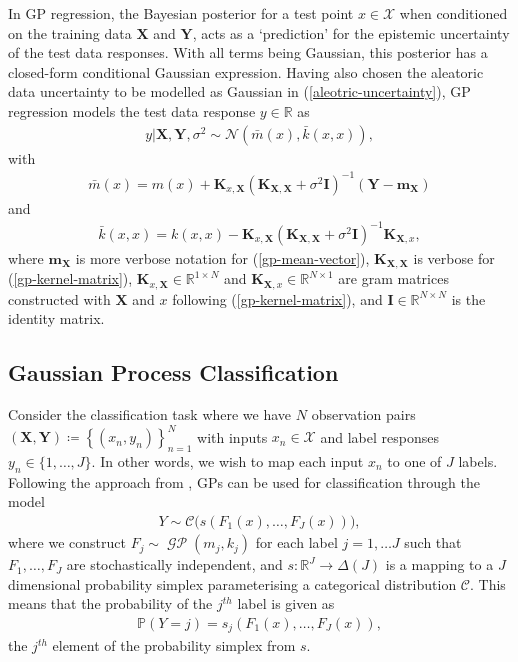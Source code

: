 \documentclass{article}
\newcommand{\GP}{\operatorname{\mathcal{GP}}}
\numberwithin{equation}{section}
\begin{document}
In GP regression, the Bayesian posterior for a test point $x \in \mathcal{X}$ when conditioned on the training data $\mathbf{X}$ and $\mathbf{Y}$, acts as a `prediction' for the epistemic uncertainty of the test data responses. 
With all terms being Gaussian, this posterior has a closed-form conditional Gaussian expression.
Having also chosen the aleatoric data uncertainty to be modelled as Gaussian in (\ref{aleotric-uncertainty}), GP regression models the test data response $y \in \mathbb{R}$ as
\begin{align}
    y \vert \mathbf{X}, \mathbf{Y}, \sigma^2
    \sim \mathcal{N}\left(\bar{m}(x), \bar{k}(x, x)\right),
    \label{gp-posterior-normal}
\end{align}
with
\begin{align}
    \label{gp-posterior-mean}
    \bar{m}(x) = m(x) + \mathbf{K}_{x, \mathbf{X}} \left(\mathbf{K}_{\mathbf{X}, \mathbf{X}} + \sigma^2 \mathbf{I}\right)^{-1} \left( \mathbf{Y} - \mathbf{m}_{\mathbf{X}}\right)
\end{align}
and
\begin{align}
    \label{gp-posterior-covariance}
    \bar{k}(x, x) = k(x, x) - \mathbf{K}_{x, \mathbf{X}} \left(\mathbf{K}_{\mathbf{X}, \mathbf{X}} + \sigma^2 \mathbf{I}\right)^{-1} \mathbf{K}_{\mathbf{X}, x},
\end{align}
where $\mathbf{m}_{\mathbf{X}}$ is more verbose notation for (\ref{gp-mean-vector}), $\mathbf{K}_{\mathbf{X}, \mathbf{X}}$ is verbose for (\ref{gp-kernel-matrix}), $\mathbf{K}_{x, \mathbf{X}} \in \mathbb{R}^{1 \times N}$ and $\mathbf{K}_{\mathbf{X}, x} \in \mathbb{R}^{N \times 1}$ are gram matrices constructed with $\mathbf{X}$ and $x$ following (\ref{gp-kernel-matrix}), and $\mathbf{I} \in \mathbb{R}^{N \times N}$ is the identity matrix.

\subsection{Gaussian Process Classification}
Consider the classification task where we have $N$ observation pairs $(\mathbf{X}, \mathbf{Y}) \coloneqq \left\{(x_n, y_n)\right\}_{n=1}^{N}$ with inputs $x_n \in \mathcal{X}$ and label responses $y_n \in \{1, \dots, J\}$. In other words, we wish to map each input $x_n$ to one of $J$ labels. Following the approach from \cite{matthews2017scalable}, GPs can be used for classification through the model
\begin{align}
    Y \sim \mathcal{C}\Big(s\left(F_1(x), \dots, F_J(x)\right)\Big),
    \label{gp-classifier}
\end{align}
where we construct $F_j \sim \GP\left(m_j, k_j\right)$ for each label $j=1, \dots J$ such that $F_1, \dots, F_J$ are stochastically independent, and $s: \mathbb{R}^J \rightarrow \Delta(J)$ is a mapping to a $J$ dimensional probability simplex parameterising a categorical distribution $\mathcal{C}$. 
This means that the probability of the $j^{th}$ label is given as
\begin{align}
    \mathbb{P}(Y=j) = s_j(F_1(x), \dots, F_J(x)),
\end{align}
the $j^{th}$ element of the probability simplex from $s$.
\end{document}
